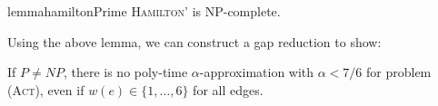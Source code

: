 \documentclass[runningheads]{llncs}
\numberwithin{equation}{section}
\newcommand{\set}[1]{\{ #1 \}}
\newcommand{\fromto}[2]{\set{#1, \ldots, #2}}
\newcommand{\act}{\textsc{(Act)}}
\begin{document}
\begin{restatable}{lemma}{hamiltonPrime}
\label{hamilton_cycle_lemma}
\textsc{Hamilton'} is NP-complete.
\end{restatable} 

Using the above lemma, we can construct a gap reduction to show:

\begin{theorem}
\label{corollary_act_no_approx}
If $P \neq NP$, there is no poly-time $\alpha$-approximation with $\alpha < 7/6$ for problem {\act}, even if $w(e) \in \fromto{1}{6}$ for all edges.
\end{theorem}
\end{document}
